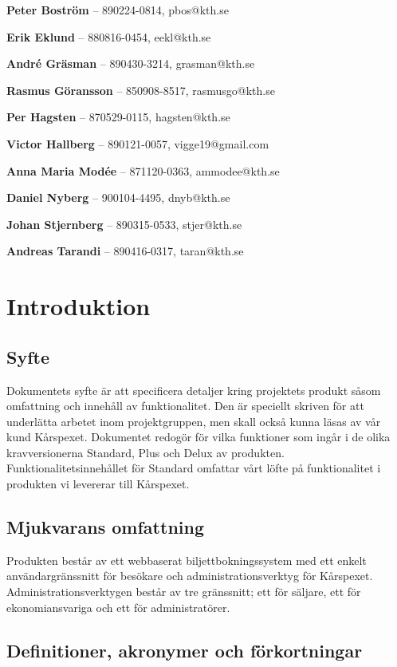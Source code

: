 \documentclass[a4paper, twoside, 11pt, titlepage]{article}
\begin{document}
\textbf{Peter Boström} -- 890224-0814, pbos@kth.se

\textbf{Erik Eklund} -- 880816-0454, eekl@kth.se 

\textbf{André Gräsman} -- 890430-3214, grasman@kth.se 

\textbf{Rasmus Göransson} -- 850908-8517, rasmusgo@kth.se 

\textbf{Per Hagsten} -- 870529-0115, hagsten@kth.se

\textbf{Victor Hallberg} -- 890121-0057, vigge19@gmail.com 

\textbf{Anna Maria Modée} -- 871120-0363, ammodee@kth.se 

\textbf{Daniel Nyberg} -- 900104-4495, dnyb@kth.se 

\textbf{Johan Stjernberg} -- 890315-0533, stjer@kth.se

\textbf{Andreas Tarandi} -- 890416-0317, taran@kth.se

\clearpage
\section{Introduktion}



	\subsection{Syfte}


	Dokumentets syfte är att specificera detaljer kring projektets produkt såsom omfattning och innehåll av funktionalitet. Den är speciellt skriven för att underlätta arbetet inom projektgruppen, men skall också kunna läsas av vår kund Kårspexet. Dokumentet redogör för vilka funktioner som ingår i de olika kravversionerna Standard, Plus och Delux av produkten. Funktionalitetsinnehållet för Standard omfattar vårt löfte på funktionalitet i produkten vi levererar till Kårspexet.

	\subsection{Mjukvarans omfattning}


	Produkten består av ett webbaserat biljettbokningssystem med ett enkelt användargränssnitt för besökare och administrationsverktyg för Kårspexet. Administrationsverktygen består av tre gränssnitt; ett för säljare, ett för ekonomiansvariga och ett för administratörer.

	\subsection{Definitioner, akronymer och förkortningar}
\end{document}
